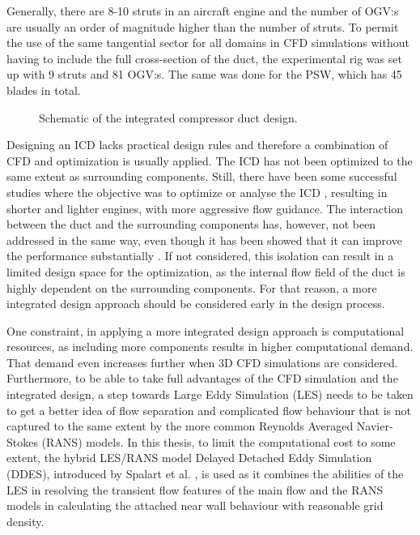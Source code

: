 Generally, there are 8-10 struts in an aircraft engine and the number of OGV:s are usually an order of magnitude higher than the number of struts. To permit the use of the same tangential sector for all domains in CFD simulations without having to include the full cross-section of the duct, the experimental rig was set up with 9 struts and 81 OGV:s. The same was done for the PSW, which has 45 blades in total.

 \begin{figure}[h!]
   \centering

  \caption{Schematic of the integrated compressor duct design.}
  \label{fig:schema}
\end{figure}

Designing an ICD lacks practical design rules and therefore a combination of CFD and optimization is usually applied. The ICD has not been optimized to the same extent as surrounding components. Still, there have been some successful studies where the objective was to optimize or analyse the ICD \cite{CompressorOpt,OptComp1,OptComp2,Walker2011}, resulting in shorter and lighter engines, with more aggressive flow guidance. The interaction between the duct and the surrounding components has, however, not been addressed in the same way, even though it has been showed that it can improve the performance substantially \cite{IntegrP2}. If not considered, this isolation can result in a limited design space for the optimization, as the internal flow field of the duct is highly dependent on the surrounding components. For that reason, a more integrated design approach should be considered early in the design process.

One constraint, in applying a more integrated design approach is computational resources, as including more components results in higher computational demand. That demand even increases further when 3D CFD simulations are considered. Furthermore, to be able to take full advantages of the CFD simulation and the integrated design, a step towards Large Eddy Simulation (LES) needs to be taken to get a better idea of flow separation and complicated flow behaviour that is not captured to the same extent by the more common Reynolds Averaged Navier-Stokes (RANS) models. In this thesis, to limit the computational cost to some extent, the hybrid LES/RANS model Delayed Detached Eddy Simulation (DDES), introduced by Spalart et al. \cite{DDES}, is used as it combines the abilities of the LES in resolving the transient flow features of the main flow and the RANS models in calculating the attached near wall behaviour with reasonable grid density. 

